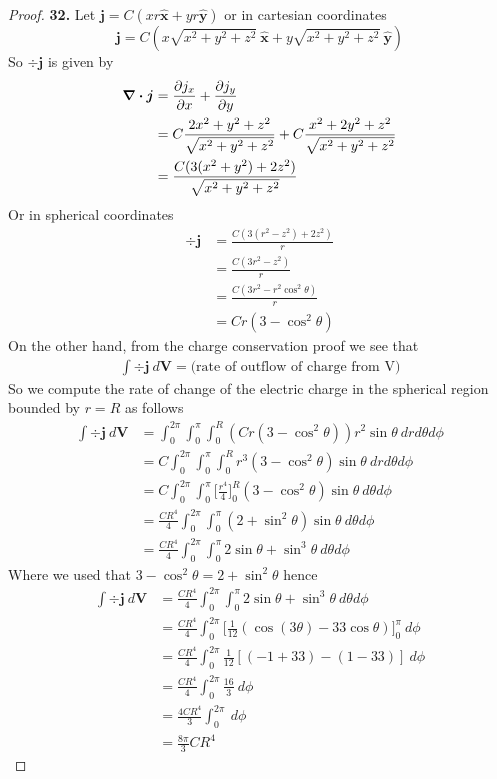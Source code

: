 \documentclass[11pt]{article}
\newcommand{\hatx}{\bm{\hat{x}}}
\newcommand{\haty}{\bm{\hat{y}}}
\theoremstyle{definition}
\begin{document}
\begin{proof}{\textbf{32.}}
    Let $\bm{j} = C(xr\hatx + yr\haty)$ or in cartesian coordinates
    $$\bm{j} = C(x\sqrt{x^2 + y^2 + z^2}~\hatx + y\sqrt{x^2 + y^2 + z^2}~\haty)$$
    So $\div \bm{j}$ is given by
    \begin{align*}
        \div \bm{j} &= \partialderivative{j_x}{x} + \partialderivative{j_y}{y}\\
        &= C\frac{2x^2 + y^2 + z^2}{\sqrt{x^2 + y^2 + z^2}}
        + C\frac{x^2 + 2y^2 + z^2}{\sqrt{x^2 + y^2 + z^2}}\\
        &= \frac{C(3(x^2 + y^2) + 2z^2)}{\sqrt{x^2 + y^2 + z^2}}
    \end{align*}
    Or in spherical coordinates
    \begin{align*}
        \div \bm{j} &= \frac{C(3(r^2 - z^2) + 2z^2)}{r}\\
        &= \frac{C(3r^2 - z^2)}{r}\\
        &= \frac{C(3r^2 - r^2\cos^2\theta)}{r}\\
        &= Cr(3 - \cos^2\theta)
    \end{align*}
    On the other hand, from the charge conservation proof we see that
    \begin{align*}
        \int \div \bm{j}~d\bm{V} = \text{(rate of outflow of charge from V)}
    \end{align*}
    So we compute the rate of change of the electric charge in the spherical
    region bounded by $r = R$ as follows
    \begin{align*}
        \int \div \bm{j}~d\bm{V}
        &= \int_0^{2\pi} \int_0^\pi \int_0^R (Cr(3 - \cos^2\theta))r^2\sin\theta~drd\theta d\phi\\
        &= C\int_0^{2\pi} \int_0^\pi \int_0^R r^3(3 - \cos^2\theta)\sin\theta~drd\theta d\phi\\
        &= C\int_0^{2\pi} \int_0^\pi \bigg[\frac{r^4}{4}\bigg]_0^R(3 - \cos^2\theta)\sin\theta~d\theta d\phi\\
        &= \frac{CR^4}{4}\int_0^{2\pi} \int_0^\pi (2 + \sin^2\theta)\sin\theta~d\theta d\phi\\
        &= \frac{CR^4}{4}\int_0^{2\pi} \int_0^\pi 2\sin\theta + \sin^3\theta~d\theta d\phi
    \end{align*}
    Where we used that $3 - \cos^2\theta = 2 + \sin^2\theta$ hence
    \begin{align*}
        \int \div \bm{j}~d\bm{V}
        &= \frac{CR^4}{4}\int_0^{2\pi} \int_0^\pi 2\sin\theta + \sin^3\theta~d\theta d\phi\\
        &= \frac{CR^4}{4}\int_0^{2\pi} \bigg[
            \frac{1}{12}(\cos(3\theta) - 33\cos\theta)
        \bigg]_0^\pi~ d\phi\\
        &= \frac{CR^4}{4}\int_0^{2\pi}
        \frac{1}{12}[(-1 + 33) - (1 - 33)]~ d\phi\\
        &= \frac{CR^4}{4}\int_0^{2\pi} \frac{16}{3}~d\phi\\
        &= \frac{4CR^4}{3}\int_0^{2\pi} ~d\phi\\
        &= \frac{8\pi}{3}CR^4
    \end{align*}
\end{proof}
\end{document}
